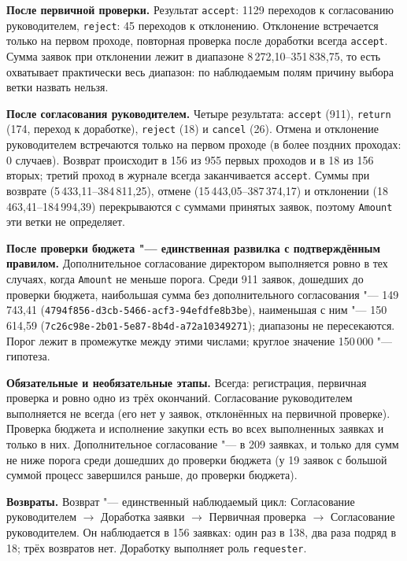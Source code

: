 \documentclass[11pt,a4paper]{article}
\begin{document}
\textbf{После первичной проверки.} Результат \texttt{accept}: 1129 переходов к согласованию руководителем, \texttt{reject}: 45 переходов к отклонению. Отклонение встречается только на первом проходе, повторная проверка после доработки всегда \texttt{accept}. Сумма заявок при отклонении лежит в диапазоне 8\,272,10--351\,838,75, то есть охватывает практически весь диапазон: по наблюдаемым полям причину выбора ветки назвать нельзя.

\textbf{После согласования руководителем.} Четыре результата: \texttt{accept} (911), \texttt{return} (174, переход к доработке), \texttt{reject} (18) и \texttt{cancel} (26). Отмена и отклонение руководителем встречаются только на первом проходе (в более поздних проходах: 0 случаев). Возврат происходит в 156 из 955 первых проходов и в 18 из 156 вторых; третий проход в журнале всегда заканчивается \texttt{accept}. Суммы при возврате (5\,433,11--384\,811,25), отмене (15\,443,05--387\,374,17) и отклонении (18\,463,41--184\,994,39) перекрываются с суммами принятых заявок, поэтому \texttt{Amount} эти ветки не определяет.

\textbf{После проверки бюджета "--- единственная развилка с подтверждённым правилом.} Дополнительное согласование директором выполняется ровно в тех случаях, когда \texttt{Amount} не меньше порога. Среди 911 заявок, дошедших до проверки бюджета, наибольшая сумма без дополнительного согласования "--- 149\,743,41 ({\scriptsize\texttt{4794f856-d3cb-5466-acf3-94efdfe8b3be}}), наименьшая с ним "--- 150\,614,59 ({\scriptsize\texttt{7c26c98e-2b01-5e87-8b4d-a72a10349271}}); диапазоны не пересекаются. Порог лежит в промежутке между этими числами; круглое значение 150\,000 "--- гипотеза.

\textbf{Обязательные и необязательные этапы.} Всегда: регистрация, первичная проверка и ровно одно из трёх окончаний. Согласование руководителем выполняется не всегда (его нет у заявок, отклонённых на первичной проверке). Проверка бюджета и исполнение закупки есть во всех выполненных заявках и только в них. Дополнительное согласование "--- в 209 заявках, и только для сумм не ниже порога среди дошедших до проверки бюджета (у 19 заявок с большой суммой процесс завершился раньше, до проверки бюджета).

\textbf{Возвраты.} Возврат "--- единственный наблюдаемый цикл: Согласование руководителем $\to$ Доработка заявки $\to$ Первичная проверка $\to$ Согласование руководителем. Он наблюдается в 156 заявках: один раз в 138, два раза подряд в 18; трёх возвратов нет. Доработку выполняет роль \texttt{requester}.
\end{document}

